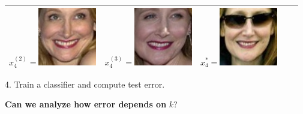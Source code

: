 \documentclass{beamer}
\begin{document}
\begin{frame}
\begin{center}
\begin{tabular}{|c|ccc|c|}
  $x_4^{(2)} = $\includegraphics[scale = 0.2]{face_photos/Patricia_Clarkson_0002.png} &  
  $x_4^{(3)} = $\includegraphics[scale = 0.2]{face_photos/Patricia_Clarkson_0003.png} &  
  $x_4^{*} = $\includegraphics[scale = 0.2]{face_photos/Patricia_Clarkson_0004.png} \\ \hline
\end{tabular}
\end{center}


\vspace{0.1in}
4. Train a classifier and compute test error. \pause

\vspace{0.1in}
\textbf{Can we analyze how error depends on }$k$?
\end{frame}
\end{document}
